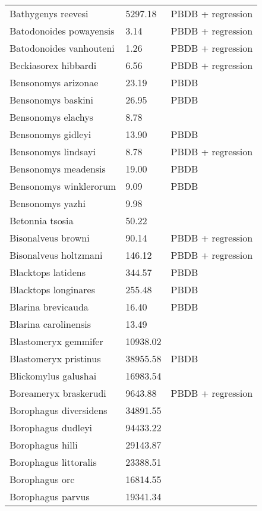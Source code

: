 \documentclass{article}
\begin{document}
\begin{center}
\begin{longtable}{p{} p{} p{}}
    Bathygenys reevesi & 5297.18 & PBDB + regression \\ 
    Batodonoides powayensis & 3.14 & PBDB + regression \\ 
    Batodonoides vanhouteni & 1.26 & PBDB + regression \\ 
    Beckiasorex hibbardi & 6.56 & PBDB + regression \\ 
    Bensonomys arizonae & 23.19 & PBDB \\ 
    Bensonomys baskini & 26.95 & PBDB \\ 
    Bensonomys elachys & 8.78 & \cite{Kirk2011} \\ 
    Bensonomys gidleyi & 13.90 & PBDB \\ 
    Bensonomys lindsayi & 8.78 & PBDB + regression \\ 
    Bensonomys meadensis & 19.00 & PBDB \\ 
    Bensonomys winklerorum & 9.09 & PBDB \\ 
    Bensonomys yazhi & 9.98 & \cite{Rose2013a} \\ 
    Betonnia tsosia & 50.22 & \cite{Clemens2005} \\ 
    Bisonalveus browni & 90.14 & PBDB + regression \\ 
    Bisonalveus holtzmani & 146.12 & PBDB + regression \\ 
    Blacktops latidens & 344.57 & PBDB \\ 
    Blacktops longinares & 255.48 & PBDB \\ 
    Blarina brevicauda & 16.40 & PBDB \\ 
    Blarina carolinensis & 13.49 & \cite{Smith2004} \\ 
    Blastomeryx gemmifer & 10938.02 & \cite{Tomiya2013} \\ 
    Blastomeryx pristinus & 38955.58 & PBDB \\ 
    Blickomylus galushai & 16983.54 & \cite{Tomiya2013} \\ 
    Boreameryx braskerudi & 9643.88 & PBDB + regression \\ 
    Borophagus diversidens & 34891.55 & \cite{Tomiya2013} \\ 
    Borophagus dudleyi & 94433.22 & \cite{Dalquest1978} \\ 
    Borophagus hilli & 29143.87 & \cite{Tomiya2013} \\ 
    Borophagus littoralis & 23388.51 & \cite{Tomiya2013} \\ 
    Borophagus orc & 16814.55 & \cite{Tomiya2013} \\ 
    Borophagus parvus & 19341.34 & \cite{Tomiya2013} \\ 

\end{longtable}
\end{center}
\end{document}

